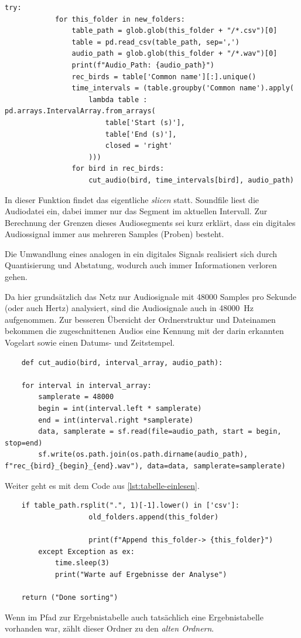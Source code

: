\begin{lstlisting}[caption={Einlesen der Ergebnistabelle und des Audiodateinamens}
]
        try:
            for this_folder in new_folders:
                table_path = glob.glob(this_folder + "/*.csv")[0] 
                table = pd.read_csv(table_path, sep=',')
                audio_path = glob.glob(this_folder + "/*.wav")[0]
                print(f"Audio_Path: {audio_path}")
                rec_birds = table['Common name'][:].unique()
                time_intervals = (table.groupby('Common name').apply( 
                    lambda table : pd.arrays.IntervalArray.from_arrays(
                        table['Start (s)'],
                        table['End (s)'],
                        closed = 'right'
                    )))
                for bird in rec_birds:
                    cut_audio(bird, time_intervals[bird], audio_path)
\end{lstlisting}
\label{lst:tabelle-einlesen}

In dieser Funktion findet das eigentliche \textit{slicen} statt. Soundfile liest die Audiodatei ein, dabei immer nur das Segment im aktuellen Intervall. 
Zur Berechnung der Grenzen dieses Audiosegments sei kurz erklärt, dass ein digitales Audiossignal immer aus mehreren Samples (Proben) besteht. 

Die Umwandlung eines analogen in ein digitales Signals realisiert sich durch Quantisierung und Abstatung, wodurch auch immer Informationen verloren gehen.

Da hier grundsätzlich das Netz nur Audiosignale mit \num{48000} Samples pro Sekunde (oder auch Hertz) analysiert, sind die Audiosignale auch in \SI{48000}{\hertz} aufgenommen. Zur besseren Übersicht der Ordnerstruktur und Dateinamen bekommen die zugeschnittenen Audios eine Kennung mit der darin erkannten Vogelart sowie einen Datums- und Zeitstempel. 

\begin{lstlisting}
    def cut_audio(bird, interval_array, audio_path):

    for interval in interval_array:        
        samplerate = 48000
        begin = int(interval.left * samplerate)
        end = int(interval.right *samplerate)
        data, samplerate = sf.read(file=audio_path, start = begin, stop=end)
        sf.write(os.path.join(os.path.dirname(audio_path), f"rec_{bird}_{begin}_{end}.wav"), data=data, samplerate=samplerate)
\end{lstlisting}

Weiter geht es mit dem Code aus \ref{lst:tabelle-einlesen}.
\begin{lstlisting}
    if table_path.rsplit(".", 1)[-1].lower() in ['csv']:
                    old_folders.append(this_folder)
                    
                    print(f"Append this_folder-> {this_folder}")
        except Exception as ex:
            time.sleep(3)
            print("Warte auf Ergebnisse der Analyse")
        
    return ("Done sorting")
\end{lstlisting}
Wenn  im Pfad zur Ergebnistabelle auch tatsächlich eine Ergebnistabelle vorhanden war, zählt dieser Ordner zu den \textit{alten Ordnern}. 




